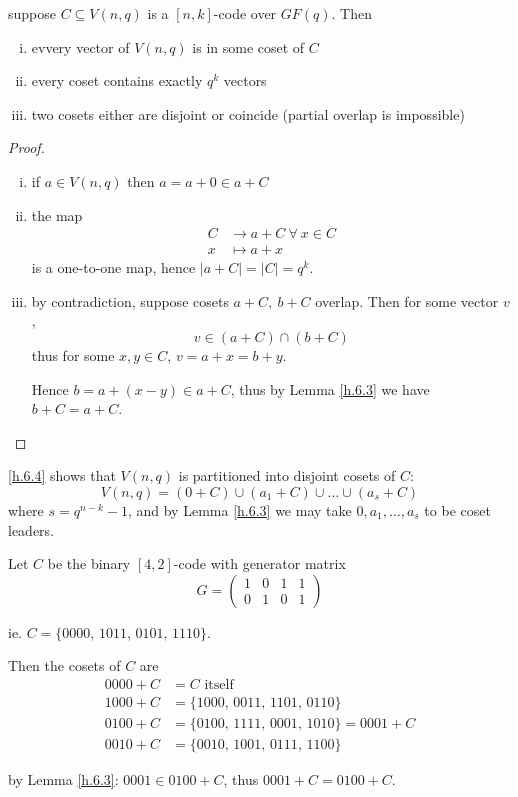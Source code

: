 \documentclass{article}
\theoremstyle{definition}
\newenvironment{thm}[1]
{\renewcommand\theinnerthm{#1}\innerthm}
{\endinnerthm}
\newenvironment{cor}[1]
{\renewcommand\theinnercor{#1}\innercor}
{\endinnercor}
\newenvironment{eg}[1]
{\renewcommand\theinnereg{#1}\innereg}
{\endinnereg}
\newcommand{\Vnq}{V(n, q)}
\begin{document}
\begin{thm}{6.4}[Lagrange] \label{h.6.4}
  suppose $C \subseteq \Vnq$ is a $[n,k]$-code over $GF(q)$. Then
  \begin{enumerate}[i.]
    \item evvery vector of $\Vnq$ is in some coset of $C$
    \item every coset contains exactly $q^k$ vectors
    \item two cosets either are disjoint or coincide (partial overlap is impossible)
  \end{enumerate}
\end{thm}
\begin{proof}
  \begin{enumerate}[i.]
    \item if $a\in \Vnq$ then $a=a+0 \in a+C$
    \item the map
      \begin{align*}
        C &\longrightarrow a+C ~\forall~ x \in C\\
        x &\longmapsto a+x
      \end{align*}
      is a one-to-one map, hence $|a+C| = |C| = q^k$.
    \item by contradiction, suppose cosets $a+C,~ b+C$ overlap. Then for some vector $v$,
      $$v \in (a+C) \cap (b+C)$$
      thus for some $x,y \in C$, $v=a+x=b+y$.

      Hence $b=a+(x-y) \in a+C$, thus by Lemma \ref{h.6.3} we have $b+C=a+C$.
  \end{enumerate}
\end{proof}

\begin{cor}{}
  \ref{h.6.4} shows that $\Vnq$ is partitioned into disjoint cosets of $C$:
  $$\Vnq = (0+C) \cup (a_1+C) \cup \ldots \cup (a_s +C)$$
  where $s=q^{n-k} -1$, and by Lemma \ref{h.6.3} we may take $0, a_1, \ldots, a_s$ to be coset leaders.
\end{cor}

\begin{eg}{6.5} \label{h.6.5}
  Let $C$ be the binary $[4,2]$-code with generator matrix
$$
G = \begin{pmatrix}
1 & 0 & 1 & 1 \\
0 & 1 & 0 & 1
\end{pmatrix}
$$

ie.
$C = \{0000,\, 1011,\, 0101,\, 1110\}$.

Then the cosets of $C$ are
\begin{align*}
  0000 + C &= C \text{ itself}\\
  1000 + C &= \{1000,\, 0011,\, 1101,\, 0110\}\\
  0100 + C &= \{0100,\, 1111,\, 0001,\, 1010\} = 0001+C\\
  0010 + C &= \{0010,\, 1001,\, 0111,\, 1100\}
\end{align*}

by Lemma \ref{h.6.3}: $0001 \in 0100 + C$, thus $0001+C=0100+C$.
\end{eg}
\end{document}
